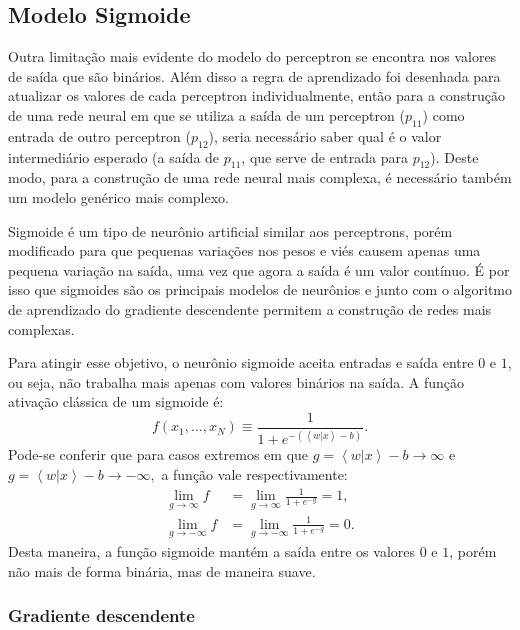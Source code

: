 \subsection{Modelo Sigmoide}

Outra limitação mais evidente do modelo do perceptron se encontra nos valores de saída que são binários. Além disso a regra de aprendizado foi desenhada para atualizar os valores de cada perceptron individualmente, então para a construção de uma rede neural em que se utiliza a saída de um perceptron ($p_{11}$) como entrada de outro perceptron ($p_{12}$), seria necessário saber qual é o valor intermediário esperado  (a saída de $p_{11}$, que serve de entrada para $p_{12}$). Deste modo, para a construção de uma rede neural mais complexa, é necessário também um modelo genérico mais complexo.

Sigmoide é um tipo de neurônio artificial similar aos perceptrons, porém modificado para que pequenas variações nos pesos e viés causem apenas uma pequena variação na saída, uma vez que agora a saída é um valor contínuo. É por isso que sigmoides são os principais modelos de neurônios e junto com o algoritmo de aprendizado do gradiente descendente permitem a construção de redes mais complexas.

Para atingir esse objetivo, o neurônio sigmoide aceita entradas e saída entre $0$ e $1$, ou seja, não trabalha mais apenas com valores binários na saída. A função ativação clássica de um sigmoide é:
\begin{equation}f\left(x_{1},\dots,x_{N}\right)\equiv\frac{1}{1+e^{-\left(\left\langle w|x\right\rangle -b\right)}}. \end{equation}
Pode-se conferir que para casos extremos em que $g=\left\langle w|x\right\rangle -b\rightarrow\infty$ e $g= \left\langle w|x\right\rangle -b\rightarrow -\infty,$  a função vale respectivamente:
\begin{equation}
\begin{split}
\lim_{g\rightarrow\infty}f & =\lim_{g\rightarrow \infty}\frac{1}{1+e^{-g}}=1, \\
\lim_{g\rightarrow-\infty}f & =\lim_{g\rightarrow-\infty}\frac{1}{1+e^{-g}}=0.
\end{split} 
\end{equation}
Desta maneira, a função sigmoide mantém a saída entre os valores $0$ e $1$, porém não mais de forma binária, mas de maneira suave.

\subsubsection{Gradiente descendente}

